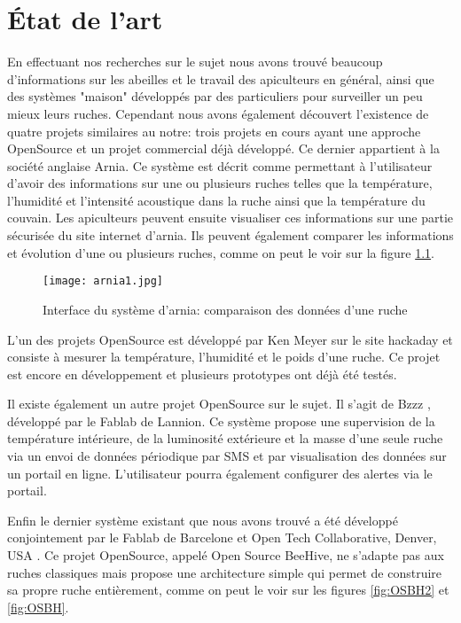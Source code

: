 \chapter{État de l'art}

En effectuant nos recherches sur le sujet nous avons trouvé beaucoup d'informations sur les abeilles et le travail des apiculteurs en général, ainsi que des systèmes "maison" développés par des particuliers pour surveiller un peu mieux leurs ruches. Cependant nous avons également découvert l'existence de quatre projets similaires au notre: trois projets en cours ayant une approche OpenSource et un projet commercial déjà développé. Ce dernier appartient à la société anglaise Arnia. Ce système est décrit \cite{arnia} comme permettant à l'utilisateur d'avoir des informations sur une ou plusieurs ruches telles que la température, l'humidité et l'intensité acoustique dans la ruche ainsi que la température du couvain. Les apiculteurs peuvent ensuite visualiser ces informations sur une partie sécurisée du site internet d'arnia. Ils peuvent également comparer les informations et évolution d'une ou plusieurs ruches, comme on peut le voir sur la figure \ref{fig:arnia1}.

\begin{figure}[h]
\centering\texttt{[image: arnia1.jpg]}
\caption{\label{fig:arnia1} Interface du système d'arnia: comparaison des données d'une ruche}
\end{figure}

L'un des projets OpenSource est développé par Ken Meyer sur le site hackaday \cite{hackaday} et consiste à mesurer la température, l'humidité et le poids d'une ruche. Ce projet est encore en développement et plusieurs prototypes ont déjà été testés.

Il existe également un autre projet OpenSource sur le sujet. Il s'agit de Bzzz \cite{projetBzzz}, développé par le Fablab de Lannion. Ce système propose une supervision de la température intérieure, de la luminosité extérieure et la masse d'une seule ruche via un envoi de données périodique par SMS et par visualisation des données sur un portail en ligne. L'utilisateur pourra également configurer des alertes via le portail.

Enfin le dernier système existant que nous avons trouvé a été développé conjointement par le Fablab de Barcelone et Open Tech Collaborative, Denver, USA \cite{OpenBeehives}. Ce projet OpenSource, appelé Open Source BeeHive, ne s'adapte pas aux ruches classiques mais propose une architecture simple qui permet de construire sa propre ruche entièrement, comme on peut le voir sur les figures \ref{fig:OSBH2} et \ref{fig:OSBH}.

